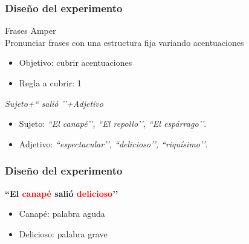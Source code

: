 \documentclass[mathserif]{beamer}%
\begin{document}
\begin{frame}
\frametitle{Diseño del experimento}
	{\Large Frases Amper} \\
	Pronunciar frases con una estructura fija variando acentuaciones
	
	\begin{itemize}
		\item Objetivo: cubrir acentuaciones
		\item Regla a cubrir: 1
	\end{itemize}
	
{\footnotesize 	
	\begin{center}
		\textit{Sujeto+`` salió ’’+Adjetivo} 
	
		\begin{itemize}
			\item Sujeto: \textit{``El canapé’’, ``El repollo’’, ``El espárrago’’}.
			\item Adjetivo: \textit{``espectacular’’, ``delicioso’’, ``riquísimo’’}.
		\end{itemize}
		
	\end{center}
}
\end{frame} 

\begin{frame}
	\frametitle{Diseño del experimento}

	\begin{center}
		\textbf{``El \textcolor{red}{canapé} salió \textcolor{red}{delicioso}’’}
	\end{center}
	
	\begin{itemize}
		\item Canapé: palabra aguda
		\item Delicioso: palabra grave
	\end{itemize}
\end{frame} 
\end{document}
